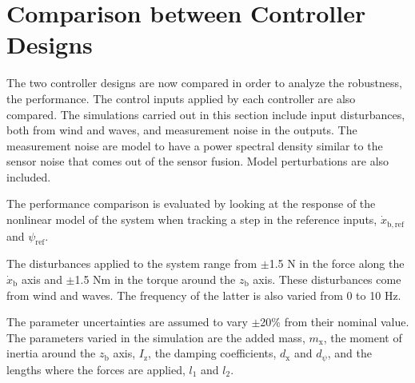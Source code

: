 \section{Comparison between Controller Designs}\label{sec:comparison}
The two controller designs are now compared in order to analyze the robustness, the performance. The control inputs applied by each controller are also compared. The simulations carried out in this section include input disturbances, both from wind and waves, and measurement noise in the outputs. The measurement noise are model to have a power spectral density similar to the sensor noise that comes out of the sensor fusion. Model perturbations are also included.

The performance comparison is evaluated by looking at the response of the nonlinear model of the system when tracking a step in the reference inputs, $\dot{x}_\mathrm{b,ref}$ and $\psi_\mathrm{ref}$. 

The disturbances applied to the system range from $\pm$\num{1.5} N in the force along the $\dot{x}_\mathrm{b}$ axis and $\pm$\num{1.5} Nm in the torque around the $z_\mathrm{b}$ axis. These disturbances come from wind and waves. The frequency of the latter is also varied from 0 to 10 Hz.

The parameter uncertainties are assumed to vary $\pm$20\% from their nominal value. The parameters varied in the simulation are the added mass, $m_\mathrm{x}$, the moment of inertia around the $z_\mathrm{b}$ axis, $I_\mathrm{z}$, the damping coefficients, $d_\mathrm{x}$ and $d_\psi$, and the lengths where the forces are applied, $l_1$ and $l_2$. 


